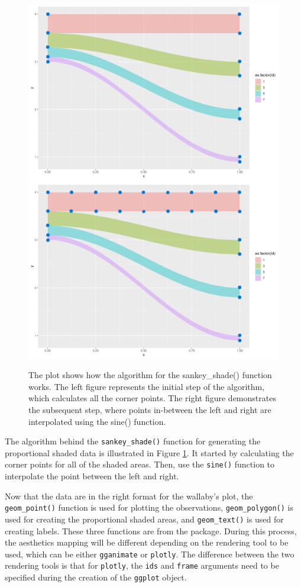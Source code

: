 \begin{figure}
\includegraphics[width=0.5\linewidth]{figures/sankey-shade-1} \includegraphics[width=0.5\linewidth]{figures/sankey-shade-2} \caption{The plot shows how the algorithm for the sankey\_shade() function works. The left figure represents the initial step of the algorithm, which calculates all the corner points. The right figure demonstrates the subsequent step, where points in-between the left and right are interpolated using the sine() function.}\label{fig:shade-algorithm}
\end{figure}

The algorithm behind the \texttt{sankey\_shade()} function for generating the proportional shaded data is illustrated in Figure \ref{fig:shade-algorithm}. It started by calculating the corner points for all of the shaded areas. Then, use the \texttt{sine()} function to interpolate the point between the left and right.

Now that the data are in the right format for the wallaby's plot, the \texttt{geom\_point()} function is used for plotting the observations, \texttt{geom\_polygon()} is used for creating the proportional shaded areas, and \texttt{geom\_text()} is used for creating labels. These three functions are from the  package. During this process, the aesthetics mapping will be different depending on the rendering tool to be used, which can be either \texttt{gganimate} or \texttt{plotly}. The difference between the two rendering tools is that for \texttt{plotly}, the \texttt{ids} and \texttt{frame} arguments need to be specified during the creation of the \texttt{ggplot} object.

